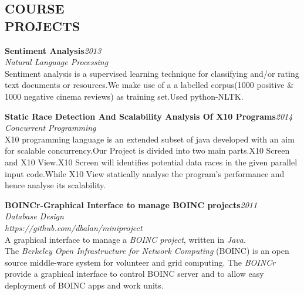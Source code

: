 \documentclass[line,margin]{res}
\begin{document}
\begin{resume}
  \section{COURSE \\ PROJECTS}

  \textbf{Sentiment Analysis}\hfill \textit{2013}\\
  \textit{Natural Language Processing}\\
  Sentiment analysis is a supervised learning technique for classifying and/or rating text documents or resources.We make use of a a labelled corpus(1000 positive \& 1000 negative cinema reviews) as training set.Used python-NLTK.\newline


  \textbf{Static Race Detection And Scalability Analysis Of X10 Programs}\hfill\textit{2014}\\
  \textit{Concurrent Programming}\\
  X10 programming language is an extended subset of java developed with an aim for
  scalable concurrency.Our Project is divided into two main parts.X10 Screen and X10 View.X10 Screen will identifies potential data races in the given parallel input code.While X10 View statically analyse the program's performance and hence analyse its scalability.\newline


  \textbf{ BOINCr-Graphical Interface to manage BOINC projects}\hfill \textit{2011}\\
  \textit{Database Design}\\
  \textit{https://github.com/dbalan/miniproject}\\
  A graphical interface to manage a \textit{BOINC project}, written in \textit{Java}.\\
  The \textit{Berkeley Open Infrastructure for Network Computing }(BOINC) is an open source middle-ware system for volunteer and grid computing. The \textit{BOINCr} provide a graphical interface to control BOINC server and to allow easy deployment of BOINC apps and work units.\\\\



\end{resume}
\end{document}
